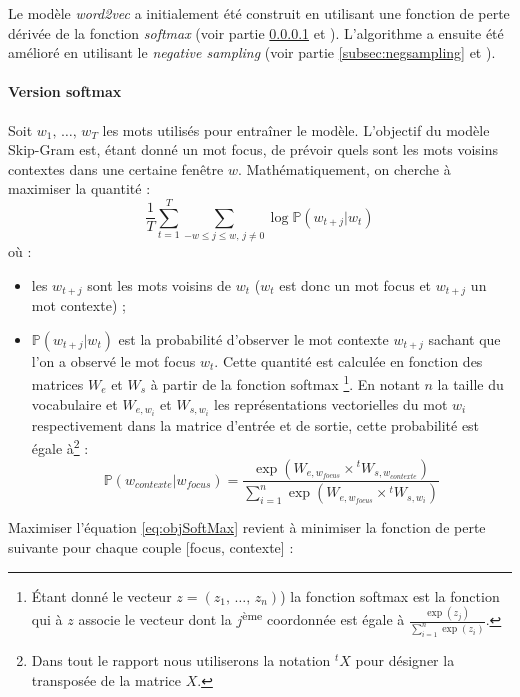 \documentclass[11pt,french,french]{article}
\let\rmarkdownfootnote\footnote%
\def\footnote{\protect\rmarkdownfootnote}
\begin{document}
Le modèle \emph{word2vec} a initialement été construit en utilisant une fonction de perte dérivée de la fonction \emph{softmax} (voir partie \ref{subsec:softmax} et \cite{Mikolov}). L'algorithme a ensuite été amélioré en utilisant le \emph{negative sampling} (voir partie \ref{subsec:negsampling} et \cite{MikolovNS}).

\hypertarget{subsec:softmax}{%
\paragraph{Version softmax}\label{subsec:softmax}}

Soit \(w_1,\,\dots,\,w_T\) les mots utilisés pour entraîner le modèle. L'objectif du modèle Skip-Gram est, étant donné un mot focus, de prévoir quels sont les mots voisins contextes dans une certaine fenêtre \(w\). Mathématiquement, on cherche à maximiser la quantité :
\begin{equation}
\frac 1 T\sum_{t=1}^T\sum_{-w\leq j \leq w,\,j\ne 0} \log \mathbb P(w_{t+j}\vert w_{t})
\label{eq:objSoftMax}
\end{equation}
où :

\begin{itemize}
\item
  les \(w_{t+j}\) sont les mots voisins de \(w_t\) (\(w_t\) est donc un mot focus et \(w_{t+j}\) un mot contexte) ;
\item
  \(\mathbb P(w_{t+j}\vert w_{t})\) est la probabilité d'observer le mot contexte \(w_{t+j}\) sachant que l'on a observé le mot focus \(w_t\).
  Cette quantité est calculée en fonction des matrices \(W_e\) et \(W_s\) à partir de la fonction softmax
  \footnote{Étant donné le vecteur \(z=(z_1,\,\dots,\,z_n)\)) la fonction softmax est la fonction qui à \(z\) associe le vecteur dont la \(j\)\textsuperscript{ème} coordonnée est égale à \(\frac{\exp(z_j)}{\sum_{i=1}^n\exp(z_i)}\).}. En notant \(n\) la taille du vocabulaire et \(W_{e,w_i}\) et \(W_{s,w_i}\) les représentations vectorielles du mot \(w_i\) respectivement dans la matrice d'entrée et de sortie, cette probabilité est égale à\footnote{Dans tout le rapport nous utiliserons la notation \(^{t}X\) pour désigner la transposée de la matrice \(X\).} :
  \[
  \mathbb P(w_{contexte}\vert w_{focus}) = 
  \frac{
  \exp(W_{e,w_{focus}}\times {}^tW_{s,w_{contexte}})
  }{
  \sum_{i=1}^n\exp(W_{e,w_{focus}}\times {}^tW_{s,w_{i}})
  }
  \]
\end{itemize}

Maximiser l'équation \eqref{eq:objSoftMax} revient à minimiser la fonction de perte suivante pour chaque couple {[}focus, contexte{]} :
\end{document}
